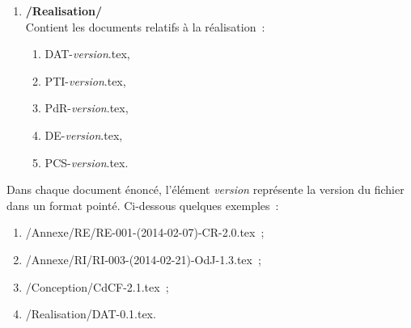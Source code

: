 \documentclass[11pt,fleqn]{report}
\begin{document}
\begin{enumerate}
\begin{enumerate}
	\end{enumerate}
	\item \textbf{/Realisation/}
	\\
	Contient les documents relatifs à la réalisation~:
	\begin{enumerate}
		\item DAT-\textit{version}.tex,
		\item PTI-\textit{version}.tex,
		\item PdR-\textit{version}.tex,
		\item DE-\textit{version}.tex,
		\item PCS-\textit{version}.tex.
	\end{enumerate}
\end{enumerate}
Dans chaque document énoncé, l'élément \textit{version} représente la version du fichier dans un format pointé. Ci-dessous quelques exemples~:
\begin{enumerate}
	\item /Annexe/RE/RE-001-(2014-02-07)-CR-2.0.tex~;
	\item /Annexe/RI/RI-003-(2014-02-21)-OdJ-1.3.tex~;
	\item /Conception/CdCF-2.1.tex~;
	\item /Realisation/DAT-0.1.tex.
\end{enumerate}
\end{document}
